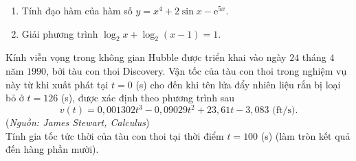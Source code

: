 \begin{bt}%
	\begin{enumerate}
		\item Tính đạo hàm của hàm số $y=x^4+2\sin x - \mathrm{e}^{5x}$.
		\item Giải phương trình $\log_2x+\log_2(x-1)=1$.
	\end{enumerate}
	
\end{bt}

\begin{bt}%
	Kính viễn vọng trong không gian Hubble được triển khai vào ngày $24$ tháng $4$ năm $1990$, bởi tàu con thoi Discovery. Vận tốc của tàu con thoi trong nghiệm vụ này từ khi xuất phát tại $t=0$ (s) cho đến khi tên lửa đẩy nhiên liệu rắn bị loại bỏ ở $t=126$ (s), được xác định theo phương trình sau
	$$v(t)=0{,}001302 t^3-0{,}09029 t^2+23{,}61 t-3{,}083\text{ (ft/s)}.$$
	(\textit{Nguồn: James Stewart, Calculus})\\
	Tính gia tốc tức  thời của tàu con thoi tại thời điểm $t=100$ (s) (làm tròn kết quả đến hàng phần mười).
\end{bt}

